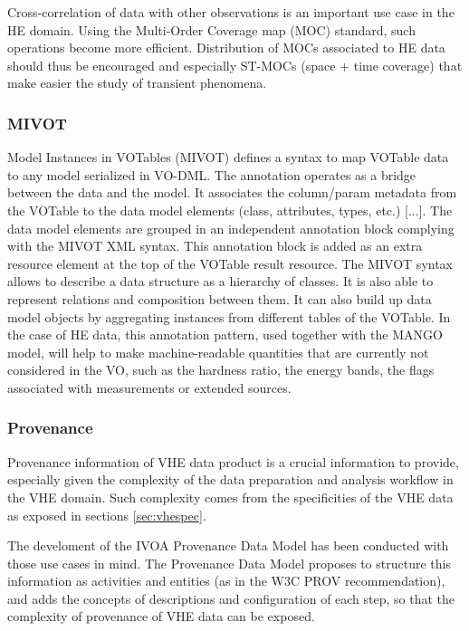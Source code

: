 \documentclass[11pt,a4paper]{ivoa}
\begin{document}
Cross-correlation of data with other observations is an important use case in the HE domain. Using the Multi-Order Coverage map (MOC) standard, such operations become more efficient. Distribution of MOCs associated to HE data should thus be encouraged and especially ST-MOCs (space + time coverage)
that make easier the study of transient phenomena.

\subsubsection{MIVOT}

Model Instances in VOTables (MIVOT) defines a syntax to map VOTable data to any model serialized in VO-DML. The annotation operates as a bridge between the data and the model. It associates the column/param metadata from the VOTable to the data model elements (class, attributes, types, etc.) [...]. The data model elements are grouped in an independent annotation block complying with the MIVOT XML syntax. This annotation block is added as an extra resource element at the top of the VOTable result resource. The MIVOT syntax allows to describe a data structure as a hierarchy of classes. It is also able to represent relations and composition between them. It can also build up data model objects by aggregating instances from different tables of the VOTable.
In the case of HE data, this annotation pattern, used together with the MANGO model, will help to make machine-readable quantities that are currently not considered in the VO, such as the hardness ratio, the energy bands, the flags associated with measurements or  extended sources.




\subsubsection{Provenance}

Provenance information of VHE data product is a crucial information to provide, especially given the complexity of the data preparation and analysis workflow in the VHE domain. Such complexity comes from the specificities of the VHE data as exposed in sections \ref{sec:vhespec}.

The develoment of the IVOA Provenance Data Model \citep{2020ivoa.spec.0411S} has been conducted with those use cases in mind. The Provenance Data Model proposes to structure this information as activities and entities (as in the W3C PROV recommendation), and adds the concepts of descriptions and configuration of each step, so that the complexity of provenance of VHE data can be exposed.
\end{document}
